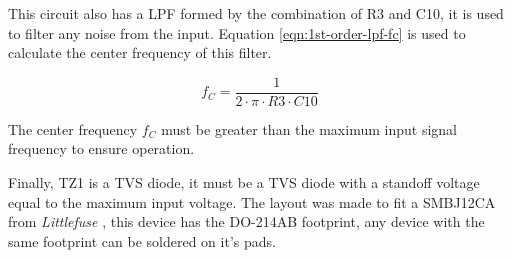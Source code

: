 		This circuit also has a LPF formed by the combination of R3 and C10, it is used to filter any noise from the input. Equation \ref{eqn:1st-order-lpf-fc} is used to calculate the center frequency of this filter.

		\begin{equation}\label{eqn:1st-order-lpf-fc}
			f_{C} = \frac{1}{2 \cdot \pi \cdot R3 \cdot C10}
		\end{equation}

		The center frequency $f_{C}$ must be greater than the maximum input signal frequency to ensure operation.

		Finally, TZ1 is a TVS diode, it must be a TVS diode with a standoff voltage equal to the maximum input voltage. The layout was made to fit a SMBJ12CA from \textit{Littlefuse} \cite{smbj12a-datasheet}, this device has the DO-214AB footprint, any device with the same footprint can be soldered on it's pads.
